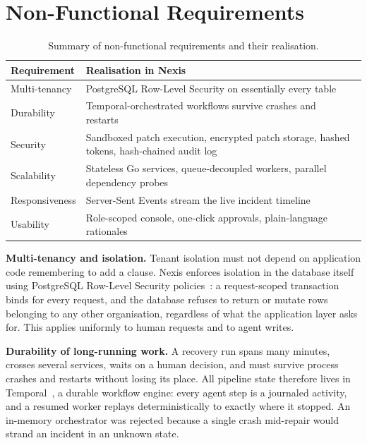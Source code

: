\section{Non-Functional Requirements}

\begin{table}[htbp]
\caption{Summary of non-functional requirements and their realisation.}
\label{tab:nfr}
\centering
\begin{tabular}{p{3.4cm}p{9.6cm}}
\toprule
\textbf{Requirement} & \textbf{Realisation in Nexis} \\
\midrule
Multi-tenancy & PostgreSQL Row-Level Security on essentially every table~\cite{pgrls} \\
Durability & Temporal-orchestrated workflows survive crashes and restarts~\cite{temporal} \\
Security & Sandboxed patch execution, encrypted patch storage, hashed tokens, hash-chained audit log \\
Scalability & Stateless Go services, queue-decoupled workers, parallel dependency probes \\
Responsiveness & Server-Sent Events stream the live incident timeline \\
Usability & Role-scoped console, one-click approvals, plain-language rationales \\
\bottomrule
\end{tabular}
\end{table}

\textbf{Multi-tenancy and isolation.} Tenant isolation must not depend on
application code remembering to add a  clause.
Nexis enforces isolation in the database itself using PostgreSQL Row-Level
Security policies~\cite{pgrls}: a request-scoped transaction binds
 for every request, and the database refuses to
return or mutate rows belonging to any other organisation, regardless of what
the application layer asks for. This applies uniformly to human requests and
to agent writes.

\textbf{Durability of long-running work.} A recovery run spans many minutes,
crosses several services, waits on a human decision, and must survive process
crashes and restarts without losing its place. All pipeline state therefore
lives in Temporal~\cite{temporal}, a durable workflow engine: every agent
step is a journaled activity, and a resumed worker replays deterministically
to exactly where it stopped. An in-memory orchestrator was rejected because a
single crash mid-repair would strand an incident in an unknown state.

